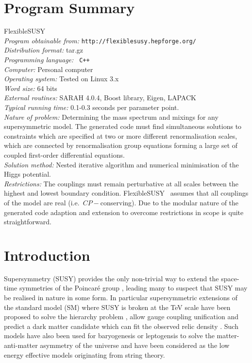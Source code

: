\documentclass[final,3p,11pt,pdflatex]{elsarticle}
\makeatletter
\newcommand{\fs}{FlexibleSUSY\@\xspace}
\makeatother
\begin{document}
\section{Program Summary}
 \fs\\ {\em Program obtainable from:}
         {\tt http://flexiblesusy.hepforge.org/}\\ {\em Distribution
           format:}\/ tar.gz\\ {\em Programming language:} {\tt
           C++}\\ {\em Computer:}\/ Personal computer\\ {\em Operating
           system:}\/ Tested on Linux 3.x\\ {\em Word size:}\/ 64
         bits\\ {\em External routines:}\/ SARAH 4.0.4, Boost library,
         Eigen, LAPACK\\ {\em
           Typical running time:}\/ 0.1-0.3 seconds per parameter
         point.\\ {\em Nature of problem:}\/ Determining the mass
         spectrum and mixings for any supersymmetric model. The
         generated code must find simultaneous solutions to
         constraints which are specified at two or more different
         renormalisation scales, which are connected by
         renormalisation group equations forming a large set of
         coupled first-order differential equations. \\ {\em Solution method:}\/
         Nested iterative algorithm and numerical minimisation of the
         Higgs potential.  \\ {\em Restrictions:} The couplings must
         remain perturbative at all scales between the highest and
         lowest boundary condition.  \fs~ assumes that all couplings
         of the model are real (i.e.\ $CP-$conserving). Due to the
         modular nature of the generated code adaption and extension
         to overcome restrictions in scope is quite straightforward.





\newpage
\section{Introduction}
Supersymmetry (SUSY) provides the only non-trivial way to extend the
space-time symmetries of the Poincar\'e
group \cite{Coleman:1967ad,Haag:1974qh}, leading many to suspect that
SUSY may be realised in nature in some form. In particular
supersymmetric extensions of the standard model (SM) where SUSY is broken
at the TeV scale have been proposed to solve the hierarchy
problem \cite{Weinberg:1975gm, Weinberg:1979bn, Gildener:1976ai,
  Susskind:1978ms, 'tHooft:1980xb}, allow gauge coupling
unification \cite{Langacker:1990jh, Ellis:1990wk, Amaldi:1991cn,
  Langacker:1991an, Giunti:1991ta} and predict a dark matter candidate
which can fit the observed relic
density \cite{Goldberg:1983nd,Ellis:1983ew}.  Such models have also
been used for baryogenesis or leptogensis to solve the
matter-anti-matter asymmetry of the universe and have been considered
as the low energy effective models originating from string
theory.
\end{document}

